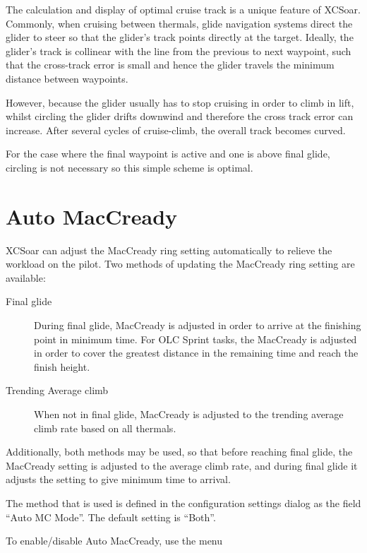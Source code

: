 \documentclass[a4paper,12pt]{refrep}
\begin{document}
The calculation and display of optimal cruise track is a unique
feature of XCSoar.  Commonly, when cruising between thermals, glide
navigation systems direct the glider to steer so that the glider's
track points directly at the target.  Ideally, the glider's track is
collinear with the line from the previous to next waypoint, such that
the cross-track error is small and hence the glider travels the
minimum distance between waypoints.

However, because the glider usually has to stop cruising in order to
climb in lift, whilst circling the glider drifts downwind and
therefore the cross track error can increase.  After several cycles of
cruise-climb, the overall track becomes curved.
%

For the case where the final waypoint is active and one is above final
glide, circling is not necessary so this simple scheme is optimal.

\section{Auto MacCready}\label{sec:auto-maccready}

XCSoar can adjust the MacCready ring setting automatically to relieve the
workload on the pilot.  Two methods of updating the MacCready ring setting
are available:
\begin{description}
\item[Final glide]  During final glide, MacCready is adjusted in order to
 arrive at the finishing point in minimum time.  For OLC Sprint tasks,
 the MacCready is adjusted in order to cover the greatest distance in the remaining
 time and reach the finish height.
\item[Trending Average climb] When not in final glide, MacCready is adjusted
to the trending average climb rate based on all thermals.
\end{description}
Additionally, both methods may be used, so that before reaching final glide,
the MacCready setting is adjusted to the average climb rate, and during final
glide it adjusts the setting to give minimum time to arrival.

The method that is used is defined in the configuration settings dialog as the
field ``Auto MC Mode''.  The default setting is ``Both''.

To enable/disable Auto MacCready, use the menu
\begin{quote}
\blink{}
\end{quote}
\end{document}
